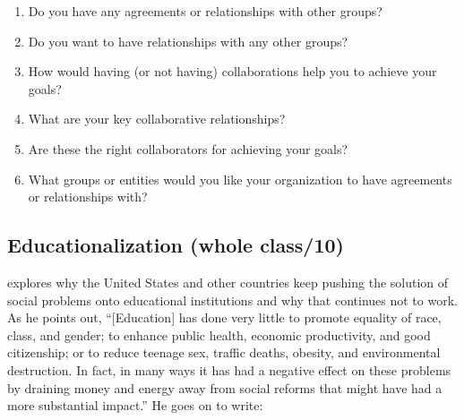 \begin{enumerate}

\item
  Do you have any agreements or relationships with other groups?

\item
  Do you want to have relationships with any other groups?

\item
  How would having (or not having) collaborations
  help you to achieve your goals?

\item
  What are your key collaborative relationships?

\item
  Are these the right collaborators for achieving your goals?

\item
  What groups or entities would you like your organization
  to have agreements or relationships with?

\end{enumerate}

\subsection*{Educationalization (whole class/10)}

\cite{Laba2008} explores why the United States and other countries
keep pushing the solution of social problems onto educational institutions
and why that continues not to work.
As he points out,
``[Education] has done very little to promote equality of race, class, and gender;
to enhance public health, economic productivity, and good citizenship;
or to reduce teenage sex, traffic deaths, obesity, and environmental destruction.
In fact,
in many ways it has had a negative effect on these problems
by draining money and energy away from social reforms that might have had a more substantial impact.''
He goes on to write:

